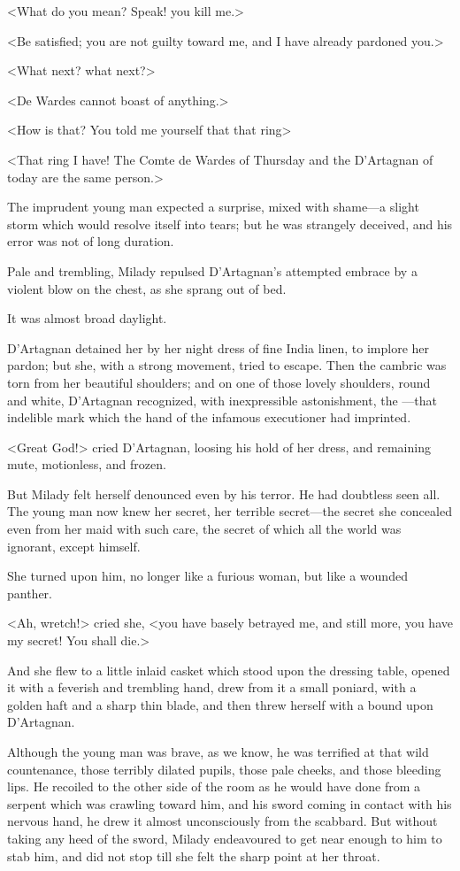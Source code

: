 <What do you mean? Speak! you kill me.> 

<Be satisfied; you are not guilty toward me, and I have already pardoned you.> 

<What next? what next?> 

<De Wardes cannot boast of anything.> 

<How is that? You told me yourself that that ring\longdash> 

<That ring I have! The Comte de Wardes of Thursday and the D'Artagnan of today are the same person.> 

The imprudent young man expected a surprise, mixed with shame—a slight storm which would resolve itself into tears; but he was strangely deceived, and his error was not of long duration. 

Pale and trembling, Milady repulsed D'Artagnan's attempted embrace by a violent blow on the chest, as she sprang out of bed. 

It was almost broad daylight. 

D'Artagnan detained her by her night dress of fine India linen, to implore her pardon; but she, with a strong movement, tried to escape. Then the cambric was torn from her beautiful shoulders; and on one of those lovely shoulders, round and white, D'Artagnan recognized, with inexpressible astonishment, the —that indelible mark which the hand of the infamous executioner had imprinted. 

<Great God!> cried D'Artagnan, loosing his hold of her dress, and remaining mute, motionless, and frozen. 

But Milady felt herself denounced even by his terror. He had doubtless seen all. The young man now knew her secret, her terrible secret—the secret she concealed even from her maid with such care, the secret of which all the world was ignorant, except himself. 

She turned upon him, no longer like a furious woman, but like a wounded panther. 

<Ah, wretch!> cried she, <you have basely betrayed me, and still more, you have my secret! You shall die.> 

And she flew to a little inlaid casket which stood upon the dressing table, opened it with a feverish and trembling hand, drew from it a small poniard, with a golden haft and a sharp thin blade, and then threw herself with a bound upon D'Artagnan. 

Although the young man was brave, as we know, he was terrified at that wild countenance, those terribly dilated pupils, those pale cheeks, and those bleeding lips. He recoiled to the other side of the room as he would have done from a serpent which was crawling toward him, and his sword coming in contact with his nervous hand, he drew it almost unconsciously from the scabbard. But without taking any heed of the sword, Milady endeavoured to get near enough to him to stab him, and did not stop till she felt the sharp point at her throat. 

